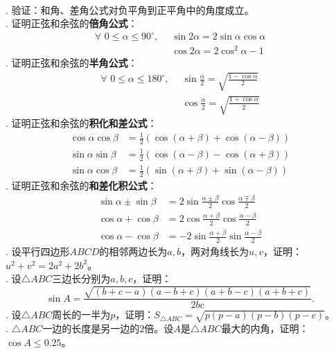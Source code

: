 \documentclass[12pt,UTF8]{ctexbook}
\begin{document}
\begin{xt}\label{xt:2-4-10}
    \mbox{} \\
    . 验证：和角、差角公式对负平角到正平角中的角度成立。 \\
    . 证明正弦和余弦的\textbf{倍角公式}：
    \begin{align*}
        \forall \,\, 0 \leqslant \alpha \leqslant 90^\circ , \,\,\, & \sin 2\alpha = 2\sin \alpha \cos \alpha  \\
        & \cos 2\alpha = 2\cos^2 \alpha - 1  
    \end{align*}
    . 证明正弦和余弦的\textbf{半角公式}：
    \begin{align*}
        \forall \,\, 0 \leqslant \alpha \leqslant 180^\circ , \,\,\, & \sin \frac{\alpha}{2} = \sqrt{\frac{1 - \cos \alpha}{2}}   \\
        & \cos \frac{\alpha}{2} = \sqrt{\frac{1 + \cos \alpha}{2}} 
    \end{align*}
    . 证明正弦和余弦的\textbf{积化和差公式}：
    \begin{align*}
        \cos \alpha \cos \beta &= \frac12 (\cos (\alpha + \beta) + \cos (\alpha - \beta))  \\
        \sin \alpha \sin \beta &= \frac12 (\cos (\alpha - \beta) - \cos (\alpha + \beta))  \\
        \sin \alpha \cos \beta &= \frac12 (\sin (\alpha + \beta) + \sin (\alpha - \beta))  
    \end{align*}
    . 证明正弦和余弦的\textbf{和差化积公式}：
    \begin{align*}
        \sin \alpha \pm \sin \beta &= 2\sin \frac{\alpha \pm \beta}{2} \cos \frac{\alpha \mp \beta}{2}  \\
        \cos \alpha + \cos \beta &= 2\cos \frac{\alpha + \beta}{2} \cos \frac{\alpha - \beta}{2}  \\
        \cos \alpha - \cos \beta &= -2\sin \frac{\alpha + \beta}{2} \sin \frac{\alpha - \beta}{2}  
    \end{align*}
    . 设平行四边形$ABCD$的相邻两边长为$a,b$，两对角线长为$u,v$，证明：$u^2 + v^2 = 2a^2 + 2b^2$。 \\
    . 设$\triangle ABC$三边长分别为$a,b,c$，证明：
    $$\sin A = \frac{\sqrt{(b+c-a)(a-b+c)(a+b-c)(a+b+c)}}{2bc}.$$ 
    . 设$\triangle ABC$周长的一半为$p$，证明：$S_{\triangle ABC} = \sqrt{p(p-a)(p-b)(p-c)}$。 \\
    . $\triangle ABC$一边的长度是另一边的$2$倍。设$A$是$\triangle ABC$最大的内角，证明：$\cos A \leqslant 0.25$。

\end{xt}
\end{document}
